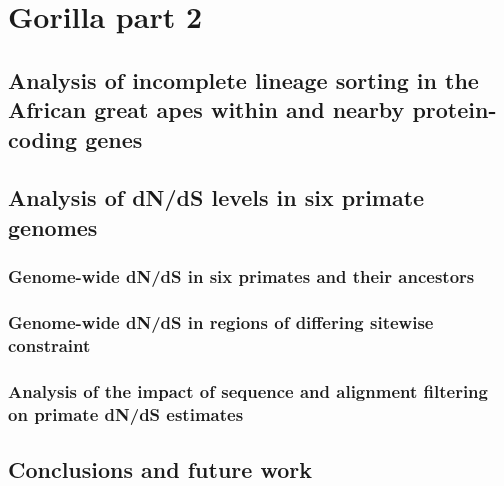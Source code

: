 \chapter{Gorilla part 2}

\section{Analysis of incomplete lineage sorting in the African great apes within and nearby protein-coding genes}

\section{Analysis of dN/dS levels in six primate genomes}

\subsection{Genome-wide dN/dS in six primates and their ancestors}

\subsection{Genome-wide dN/dS in regions of differing sitewise constraint}

\subsection{Analysis of the impact of sequence and alignment filtering on primate dN/dS estimates}

\section{Conclusions and future work}
